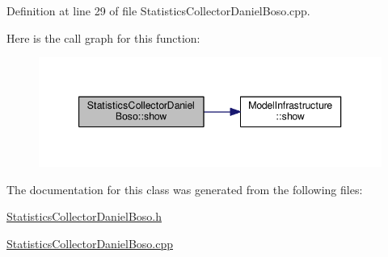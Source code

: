 Definition at line 29 of file Statistics\-Collector\-Daniel\-Boso.\-cpp.



Here is the call graph for this function\-:
\nopagebreak
\begin{figure}[H]
\begin{center}
\leavevmode
\includegraphics[width=344pt]{class_statistics_collector_daniel_boso_a38d1fe032f94a4626eb997ae75c04e74_cgraph}
\end{center}
\end{figure}




The documentation for this class was generated from the following files\-:\begin{DoxyCompactItemize}
\item 
\hyperlink{_statistics_collector_daniel_boso_8h}{Statistics\-Collector\-Daniel\-Boso.\-h}\item 
\hyperlink{_statistics_collector_daniel_boso_8cpp}{Statistics\-Collector\-Daniel\-Boso.\-cpp}\end{DoxyCompactItemize}
